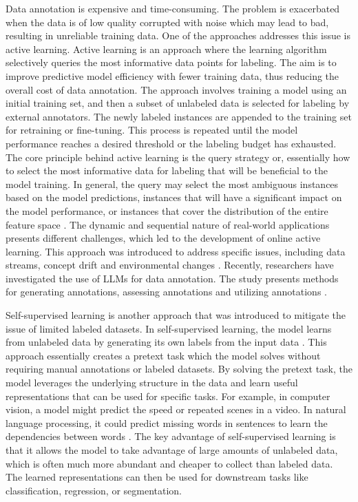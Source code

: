 \documentclass[preprint,12pt]{elsarticle}
\begin{document}
Data annotation is expensive and time-consuming. The problem is exacerbated when the data is of low quality corrupted with noise which may lead to bad, resulting in unreliable training data. One of the approaches addresses this issue is active learning. Active learning is an approach where the learning algorithm selectively queries the most informative data points for labeling. The aim is to improve predictive model efficiency with fewer training data, thus reducing the overall cost of data annotation. The approach involves training a model using an initial training set, and then a subset of unlabeled data is selected for labeling by external annotators. The newly labeled instances are appended to the training set for retraining or fine-tuning. This process is repeated until the model performance reaches a desired threshold or the labeling budget has exhausted. The core principle behind active learning is the query strategy or, essentially how to select the most informative data for labeling that will be beneficial to the model training. In general, the query may select the most ambiguous instances based on the model predictions, instances that will have a significant impact on the model performance, or instances that cover the distribution of the entire feature space \citep{li_survey_2024}. The dynamic and sequential nature of real-world applications presents different challenges, which led to the development of online active learning. This approach was introduced to address specific issues, including data streams, concept drift and environmental changes \citep{cacciarelli_active_2024}. Recently, researchers have investigated the use of LLMs for data annotation. The study presents methods for generating annotations, assessing annotations and utilizing annotations \citep{tan_large_2024}.

Self-supervised learning is another approach that was introduced to mitigate the issue of limited labeled datasets. In self-supervised learning, the model learns from unlabeled data by generating its own labels from the input data \citep{gui_survey_2024}. This approach essentially creates a pretext task which the model solves without requiring manual annotations or labeled datasets. By solving the pretext task, the model leverages the underlying structure in the data and learn useful representations that can be used for specific tasks. For example, in computer vision, a model might predict the speed \citep{altabrawee_stclr_2025} or repeated scenes \citep{altabrawee_repeat_2024} in a video. In natural language processing, it could predict missing words in sentences to learn the dependencies between words \citep{lee_predicting_2021}. The key advantage of self-supervised learning is that it allows the model to take advantage of large amounts of unlabeled data, which is often much more abundant and cheaper to collect than labeled data. The learned representations can then be used for downstream tasks like classification, regression, or segmentation.
\end{document}
